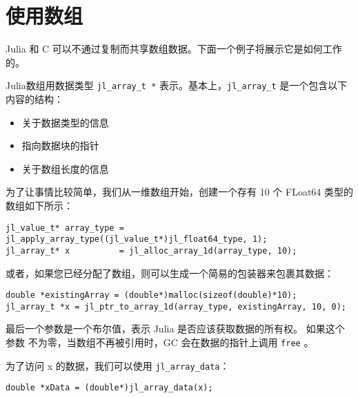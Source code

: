 \hypertarget{12793375650632651595}{}


\section{使用数组}



Julia 和 C 可以不通过复制而共享数组数据。下面一个例子将展示它是如何工作的。



Julia数组用数据类型 \texttt{jl\_array\_t *} 表示。基本上，\texttt{jl\_array\_t} 是一个包含以下内容的结构：



\begin{itemize}
\item 关于数据类型的信息


\item 指向数据块的指针


\item 关于数组长度的信息

\end{itemize}


为了让事情比较简单，我们从一维数组开始，创建一个存有 10 个 FLoat64 类型的数组如下所示：




\begin{lstlisting}
jl_value_t* array_type = jl_apply_array_type((jl_value_t*)jl_float64_type, 1);
jl_array_t* x          = jl_alloc_array_1d(array_type, 10);
\end{lstlisting}



或者，如果您已经分配了数组，则可以生成一个简易的包装器来包裹其数据：




\begin{lstlisting}
double *existingArray = (double*)malloc(sizeof(double)*10);
jl_array_t *x = jl_ptr_to_array_1d(array_type, existingArray, 10, 0);
\end{lstlisting}



最后一个参数是一个布尔值，表示 Julia 是否应该获取数据的所有权。 如果这个参数 不为零，当数组不再被引用时，GC 会在数据的指针上调用 \texttt{free} 。



为了访问 x 的数据，我们可以使用 \texttt{jl\_array\_data}：




\begin{lstlisting}
double *xData = (double*)jl_array_data(x);
\end{lstlisting}



